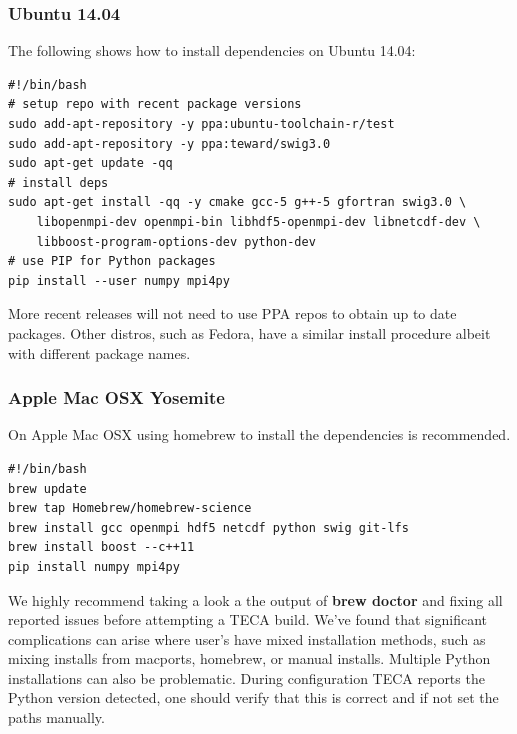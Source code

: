\documentclass[a4paper,10pt,DIV=12]{scrreprt}
\begin{document}
\subsubsection{Ubuntu 14.04}
The following shows how to install dependencies on Ubuntu 14.04:

\vspace{2mm}\hspace{0.2in}\begin{minipage}{0.8\textwidth}
\begin{verbatim}
#!/bin/bash
# setup repo with recent package versions
sudo add-apt-repository -y ppa:ubuntu-toolchain-r/test
sudo add-apt-repository -y ppa:teward/swig3.0
sudo apt-get update -qq
# install deps
sudo apt-get install -qq -y cmake gcc-5 g++-5 gfortran swig3.0 \
    libopenmpi-dev openmpi-bin libhdf5-openmpi-dev libnetcdf-dev \
    libboost-program-options-dev python-dev
# use PIP for Python packages
pip install --user numpy mpi4py
\end{verbatim}
\end{minipage}\vspace{2mm}

\noindent More recent releases will not need to use PPA repos to obtain up to date packages.
Other distros, such as Fedora, have a similar install procedure albeit with different
package names. 

\subsubsection{Apple Mac OSX Yosemite}
On Apple Mac OSX using homebrew to install the dependencies is recommended.

\vspace{2mm}\hspace{0.2in}\begin{minipage}{0.8\textwidth}
\begin{verbatim}
#!/bin/bash
brew update
brew tap Homebrew/homebrew-science
brew install gcc openmpi hdf5 netcdf python swig git-lfs
brew install boost --c++11
pip install numpy mpi4py
\end{verbatim}
\end{minipage}\vspace{2mm}

\noindent We highly recommend taking a look a the output of \textbf{brew doctor} and
fixing all reported issues before attempting a TECA build. We've found that significant
complications can arise where user's have mixed installation methods, such as mixing
installs from macports, homebrew, or manual installs. Multiple Python installations
can also be problematic. During configuration TECA reports the Python version detected,
one should verify that this is correct and if not set the paths manually.
% 
\end{document}
